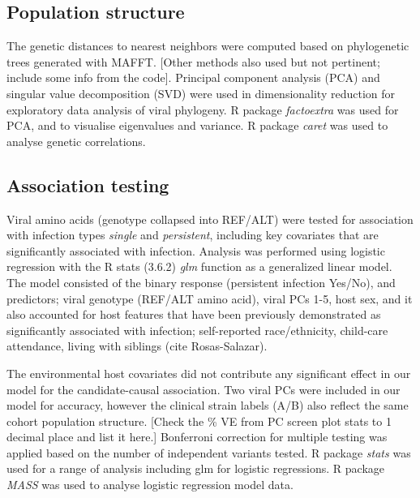 \documentclass{article}
\begin{document}
\subsection{Population structure}
The genetic distances to nearest neighbors were computed based on phylogenetic 
trees generated with MAFFT.
[Other methods also used but not pertinent; include some info from the code].
Principal component analysis (PCA) and singular value decomposition (SVD) were used in dimensionality reduction for exploratory data analysis of viral phylogeny.
R package \textit{factoextra} was used for PCA, and to visualise eigenvalues and variance. 
R package \textit{caret} was used to analyse genetic correlations.

\subsection{Association testing}
Viral amino acids (genotype collapsed into REF/ALT) were tested for association with infection types \textit{single} and \textit{persistent}, 
including key covariates that are significantly associated with infection.
Analysis was performed using logistic regression with the
R stats (3.6.2) \textit{glm} function as a generalized linear model.
The model consisted of the binary response (persistent infection Yes/No), and predictors; viral genotype (REF/ALT amino acid), viral PCs 1-5, host sex, and it also accounted for host features that have been previously demonstrated as significantly associated with infection; 
self-reported race/ethnicity, child-care attendance, living with siblings (cite Rosas-Salazar).


The environmental host covariates did not contribute any significant effect in our model for the candidate-causal association.
Two viral PCs were included in our model for accuracy, however the clinical 
strain labels (A/B) also reflect the same cohort population structure.
[Check the \% VE from PC screen plot stats to 1 decimal place and list it here.]
Bonferroni correction for multiple testing was applied based on the number of independent variants tested.
R package \textit{stats} was used for a range of analysis including glm for logistic regressions. 
R package \textit{MASS} was used to analyse logistic regression model data.
\end{document}
